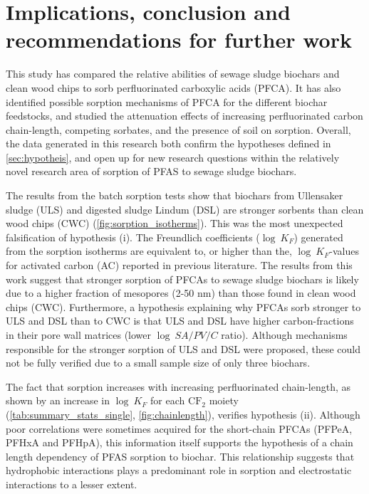 \chapter{Implications, conclusion and recommendations for further work}\label{chap:Conclusion}
This study has compared the relative abilities of sewage sludge biochars and clean wood chips to sorb perfluorinated carboxylic acids (PFCA). It has also identified possible sorption mechanisms of PFCA for the different biochar feedstocks, and studied the attenuation effects of increasing perfluorinated carbon chain-length, competing sorbates, and the presence of soil on sorption. Overall, the data generated in this research both confirm the hypotheses defined in \cref{sec:hypotheis}, and open up for new research questions within the relatively novel research area of sorption of PFAS to sewage sludge biochars.

The results from the batch sorption tests show that biochars from Ullensaker sludge (ULS) and digested sludge Lindum (DSL) are stronger sorbents than clean wood chips (CWC) (\cref{fig:sorption_isotherms}). This was the most unexpected falsification of hypothesis (i). The Freundlich coefficients ($\log~K_F$) generated from the sorption isotherms are equivalent to, or higher than the, $\log~K_F$-values for activated carbon (AC) reported in previous literature. The results from this work suggest that stronger sorption of PFCAs to sewage sludge biochars is likely due to a higher fraction of mesopores (2-50 nm) than those found in clean wood chips (CWC). Furthermore, a hypothesis explaining why PFCAs sorb stronger to ULS and DSL than to CWC is that ULS and DSL have higher carbon-fractions in their pore wall matrices (lower $\log~SA/PV/C$ ratio). Although mechanisms responsible for the stronger sorption of ULS and DSL were proposed, these could not be fully verified due to a small sample size of only three biochars. 

The fact that sorption increases with increasing perfluorinated chain-length, as shown by an increase in $\log~K_F$ for each $\mathrm{CF_2}$ moiety (\cref{tab:summary_stats_single}, \cref{fig:chainlength}), verifies hypothesis (ii). Although poor correlations were sometimes acquired for the short-chain PFCAs (PFPeA, PFHxA and PFHpA), this information itself supports the hypothesis of a chain length dependency of PFAS sorption to biochar. This relationship suggests that hydrophobic interactions plays a predominant role in sorption and electrostatic interactions to a lesser extent. 

